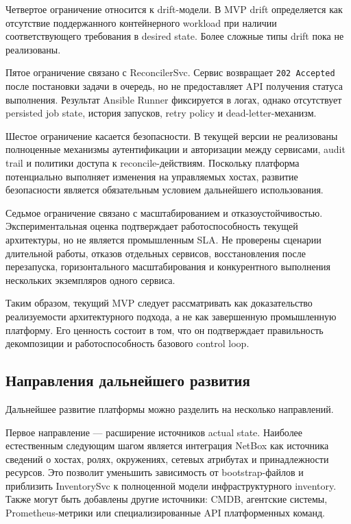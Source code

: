 Четвертое ограничение относится к drift-модели. В MVP drift определяется как отсутствие поддержанного контейнерного workload при наличии соответствующего требования в desired state. Более сложные типы drift пока не реализованы.

Пятое ограничение связано с ReconcilerSvc. Сервис возвращает \texttt{202 Accepted} после постановки задачи в очередь, но не предоставляет API получения статуса выполнения. Результат Ansible Runner фиксируется в логах, однако отсутствует persisted job state, история запусков, retry policy и dead-letter-механизм.

Шестое ограничение касается безопасности. В текущей версии не реализованы полноценные механизмы аутентификации и авторизации между сервисами, audit trail и политики доступа к reconcile-действиям. Поскольку платформа потенциально выполняет изменения на управляемых хостах, развитие безопасности является обязательным условием дальнейшего использования.

Седьмое ограничение связано с масштабированием и отказоустойчивостью. Экспериментальная оценка подтверждает работоспособность текущей архитектуры, но не является промышленным SLA. Не проверены сценарии длительной работы, отказов отдельных сервисов, восстановления после перезапуска, горизонтального масштабирования и конкурентного выполнения нескольких экземпляров одного сервиса.

Таким образом, текущий MVP следует рассматривать как доказательство реализуемости архитектурного подхода, а не как завершенную промышленную платформу. Его ценность состоит в том, что он подтверждает правильность декомпозиции и работоспособность базового control loop.

\subsection{Направления дальнейшего развития}

Дальнейшее развитие платформы можно разделить на несколько направлений.

Первое направление --- расширение источников actual state. Наиболее естественным следующим шагом является интеграция NetBox как источника сведений о хостах, ролях, окружениях, сетевых атрибутах и принадлежности ресурсов. Это позволит уменьшить зависимость от bootstrap-файлов и приблизить InventorySvc к полноценной модели инфраструктурного inventory. Также могут быть добавлены другие источники: CMDB, агентские системы, Prometheus-метрики или специализированные API платформенных команд.

